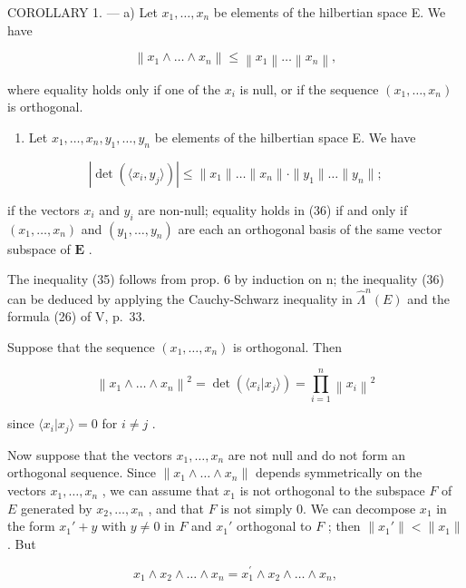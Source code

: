 COROLLARY 1. --- a) Let \(x_1, \ldots, x_n\) be elements of the hilbertian space E. We have

\[
\left\| x _ {1} \wedge \dots \wedge x _ {n} \right\| \leqslant \left\| x _ {1} \right\| \dots \left\| x _ {n} \right\|,\tag{35}
\]

where equality holds only if one of the \(x_{i}\) is null, or if the sequence \((x_{1},\dots,x_{n})\) is orthogonal.

\begin{enumerate}
\def\labelenumi{\alph{enumi})}
\setcounter{enumi}{1}
\tightlist
\item
  Let \(x_{1}, \ldots, x_{n}, y_{1}, \ldots, y_{n}\) be elements of the hilbertian space E. We have
\end{enumerate}

\[
\left| \det (\langle x _ {i}, y _ {j} \rangle) \right| \leqslant \| x _ {1} \| \dots \| x _ {n} \| \cdot \| y _ {1} \| \dots \| y _ {n} \|;\tag{36}
\]

if the vectors \(x_{i}\) and \(y_{i}\) are non-null; equality holds in (36) if and only if \((x_{1},\ldots ,x_{n})\) and \((y_{1},\dots,y_{n})\) are each an orthogonal basis of the same vector subspace of \(\mathbf{E}\) .

The inequality (35) follows from prop. 6 by induction on n; the inequality (36) can be deduced by applying the Cauchy-Schwarz inequality in \(\hat{\Lambda}^{n}(E)\) and the formula (26) of V, p.~33.

Suppose that the sequence \((x_{1},\dots,x_{n})\) is orthogonal. Then

\[
\left\| x _ {1} \wedge \dots \wedge x _ {n} \right\| ^ {2} = \det (\langle x _ {i} | x _ {j} \rangle) = \prod_ {i = 1} ^ {n} \left\| x _ {i} \right\| ^ {2}
\]

since \(\langle x_i|x_j\rangle = 0\) for \(i\neq j\) .

Now suppose that the vectors \(x_{1}, \ldots, x_{n}\) are not null and do not form an orthogonal sequence. Since \(\| x_{1} \wedge \ldots \wedge x_{n} \|\) depends symmetrically on the vectors \(x_{1}, \ldots, x_{n}\) , we can assume that \(x_{1}\) is not orthogonal to the subspace \(F\) of \(E\) generated by \(x_{2}, \ldots, x_{n}\) , and that \(F\) is not simply 0. We can decompose \(x_{1}\) in the form \(x_{1}' + y\) with \(y \neq 0\) in \(F\) and \(x_{1}'\) orthogonal to \(F\) ; then \(\| x_{1}' \| < \| x_{1} \|\) . But

\[
x _ {1} \wedge x _ {2} \wedge \ldots \wedge x _ {n} = x _ {1} ^ {\prime} \wedge x _ {2} \wedge \ldots \wedge x _ {n},
\]

